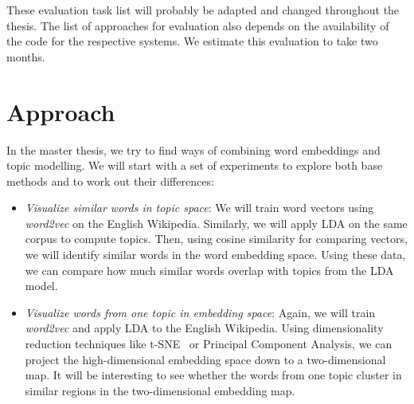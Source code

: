 \documentclass{sig-alternate-05-2015}
\begin{document}
\begin{itemize}

\end{itemize}
These evaluation task list will probably be adapted and changed throughout the thesis.
The list of approaches for evaluation also depends on the availability of the code for the respective systems.
We estimate this evaluation to take two months.

\section{Approach}
\label{sec:approach}

In the master thesis, we try to find ways of combining word embeddings and topic modelling.
We will start with a set of experiments to explore both base methods and to work out their differences:
\begin{itemize}
       \item
              \emph{Visualize similar words in topic space}:
              We will train word vectors using \emph{word2vec} on the English Wikipedia.
              Similarly, we will apply LDA on the same corpus to compute topics.
              Then, using cosine similarity for comparing vectors, we will identify similar words in the word embedding space.
              Using these data, we can compare how much similar words overlap with topics from the LDA model.
       \item
              \emph{Visualize words from one topic in embedding space}:
              Again, we will train \emph{word2vec} and apply LDA to the English Wikipedia.
              Using dimensionality reduction techniques like t-SNE~\cite{VanDerMaaten2008} or Principal Component Analysis, we can project the high-dimensional embedding space down to a two-dimensional map.
              It will be interesting to see whether the words from one topic cluster in similar regions in the two-dimensional embedding map.
\end{itemize}
\end{document}
